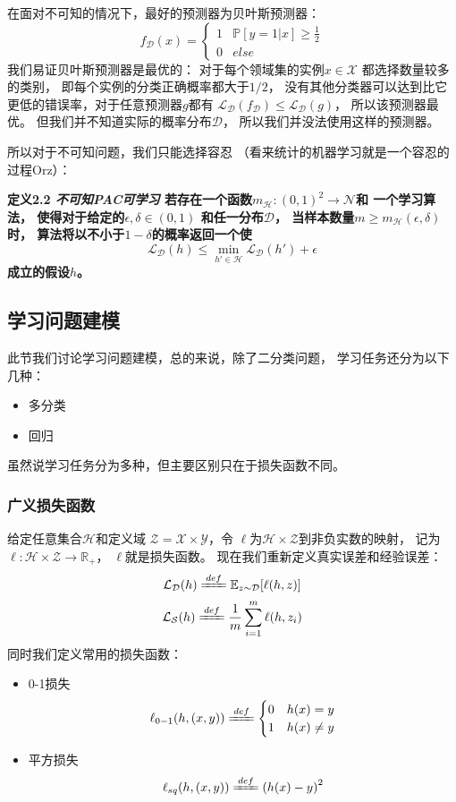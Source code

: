 \documentclass[UTF8]{ctexart}
\begin{document}
在面对不可知的情况下，最好的预测器为贝叶斯预测器：
$$
f_{\mathcal{D}}(x)=
\begin{cases}
1& \mathbb{P}[y=1|x]\geq\frac{1}{2}\\
0& else
\end{cases}
$$
我们易证贝叶斯预测器是最优的：
对于每个领域集的实例$x\in\mathcal{X}$
都选择数量较多的类别，
即每个实例的分类正确概率都大于$1/2$，
没有其他分类器可以达到比它更低的错误率，对于任意预测器$g$都有
$\mathcal{L}_{\mathcal{D}}(f_{\mathcal{D}})
\leq \mathcal{L}_{\mathcal{D}}(g)$，
所以该预测器最优。
但我们并不知道实际的概率分布$\mathcal{D}$，
所以我们并没法使用这样的预测器。

所以对于不可知问题，我们只能选择容忍
（看来统计的机器学习就是一个容忍的过程Orz）：

\textbf{
定义2.2 \textit{不可知PAC可学习}
若存在一个函数$m_{\mathcal{H}}:{(0,1)}^2\rightarrow\mathcal{N}$和
一个学习算法，
使得对于给定的$\epsilon,\delta\in(0,1)$
和任一分布$\mathcal{D}$，
当样本数量$m\geq m_{\mathcal{H}}(\epsilon,\delta)$时，
算法将以不小于$1-\delta$的概率返回一个使
$$\mathcal{L}_{\mathcal{D}}(h)\leq
\min_{h'\in\mathcal{H}}\mathcal{L}_{\mathcal{D}}(h')+\epsilon
$$
成立的假设$h$。
}

\subsection{学习问题建模}
此节我们讨论学习问题建模，总的来说，除了二分类问题，
学习任务还分为以下几种：
\begin{itemize}
\item 多分类
\item 回归
\end{itemize}
虽然说学习任务分为多种，但主要区别只在于损失函数不同。

\subsubsection{广义损失函数}
给定任意集合$\mathcal{H}$和定义域
$\mathcal{Z}=\mathcal{X}\times\mathcal{Y}$，令
$\ell$为$\mathcal{H}\times\mathcal{Z}$到非负实数的映射，
记为$\ell:\mathcal{H}\times\mathcal{Z}\rightarrow\mathbb{R}_{+}$，
$\ell$就是损失函数。
现在我们重新定义真实误差和经验误差：
$$
\mathcal{L}_{\mathcal{D}}(h)
\xlongequal{def}
\mathbb{E}_{z\sim\mathcal{D}}[\ell(h,z)]
$$
$$
\mathcal{L}_{\mathcal{S}}(h)
\xlongequal{def}
\frac{1}{m}\sum^m_{i=1}\ell(h,z_i)
$$
同时我们定义常用的损失函数：
\begin{itemize}
\item
0-1损失
$$
\ell_{0-1}(h,(x,y))
\xlongequal{def}
\begin{cases}
0& h(x)=y\\
1& h(x)\neq y
\end{cases}
$$
\item 平方损失
$$
\ell_{sq}(h,(x,y))
\xlongequal{def}
{(h(x)-y)}^2
$$
\end{itemize}
\end{document}
